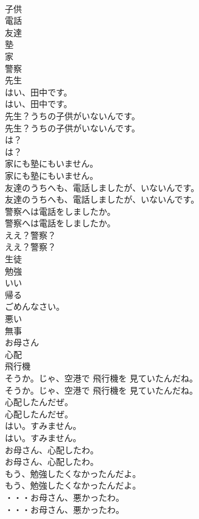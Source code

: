 \documentclass[8pt]{extreport}
\begin{document}
\begin{CJK}{UTF8}{min}
\\	子供
\\	電話
\\	友達
\\	塾
\\	家
\\	警察
\\	先生
\\	はい、田中です。	
\\	はい、田中です。 
\\	先生？うちの子供がいないんです。	
\\	先生？うちの子供がいないんです。 
\\	は？	
\\	は？ 
\\	家にも塾にもいません。	
\\	家にも塾にもいません。 
\\	友達のうちへも、電話しましたが、いないんです。	
\\	友達のうちへも、電話しましたが、いないんです。 
\\	警察へは電話をしましたか。	
\\	警察へは電話をしましたか。 
\\	ええ？警察？	
\\	ええ？警察？ 
\\	生徒
\\	勉強
\\	いい
\\	帰る
\\	ごめんなさい。
\\	悪い
\\	無事
\\	お母さん
\\	心配
\\	飛行機
\\	そうか。じゃ、空港で 飛行機を 見ていたんだね。	
\\	そうか。じゃ、空港で 飛行機を 見ていたんだね。 
\\	心配したんだぜ。	
\\	心配したんだぜ。 
\\	はい。すみません。	
\\	はい。すみません。 
\\	お母さん、心配したわ。	
\\	お母さん、心配したわ。 
\\	もう、勉強したくなかったんだよ。	
\\	もう、勉強したくなかったんだよ。 
\\	・・・お母さん、悪かったわ。	
\\	・・・お母さん、悪かったわ。 

\end{CJK}
\end{document}
